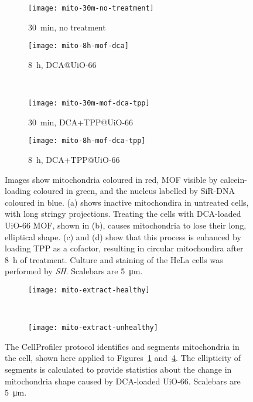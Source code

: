 \begin{figure}[p]
\centering
	\begin{subfigure}[b]{0.49\textwidth}
	\texttt{[image: mito-30m-no-treatment]}
	\caption{\SI{30}{\minute}, no treatment} \label{fig:mito-30m-no-treatment}
	\end{subfigure}
	\hfill
	\begin{subfigure}[b]{0.49\textwidth}
	\texttt{[image: mito-8h-mof-dca]}
	\caption{\SI{8}{\hour}, DCA@UiO-66} \label{fig:mito-8h-mof-dca}
	\end{subfigure}

	~\newline
		\begin{subfigure}[b]{0.49\textwidth}
	\texttt{[image: mito-30m-mof-dca-tpp]}
	\caption{\SI{30}{\minute}, DCA+TPP@UiO-66}\label{fig:mito-30m-mof-dca-tpp}
	\end{subfigure}
	\hfill
	\begin{subfigure}[b]{0.49\textwidth}
	\texttt{[image: mito-8h-mof-dca-tpp]}
	\caption{\SI{8}{\hour}, DCA+TPP@UiO-66}\label{fig:mito-8h-mof-dca-tpp}
	\end{subfigure}
\caption[MOFs: UiO-66 MOF loaded with DCA changes mitochondria's shape]{Images show mitochondria coloured in red, MOF visible by calcein-loading coloured in green, and the nucleus labelled by SiR-DNA coloured in blue. (a) shows inactive mitochondira in untreated cells, with long stringy projections. Treating the cells with DCA-loaded UiO-66 MOF, shown in (b), causes mitochondria to lose their long, elliptical shape. (c) and (d) show that this process is enhanced by loading TPP as a cofactor, resulting in circular mitochondira after \SI{8}{\hour} of treatment. Culture and staining of the HeLa cells was performed by \textit{SH}. Scalebars are \SI{5}{\micro\metre}. }
\label{fig:mito-SIM-images}
\end{figure}
\begin{figure}[p]
\centering
	\begin{subfigure}[b]{0.49\textwidth}

\texttt{[image: mito-extract-healthy]}
	\caption{}
	\end{subfigure} ~
	\begin{subfigure}[b]{0.49\textwidth}
	\texttt{[image: mito-extract-unhealthy]}
	\caption{}
	\end{subfigure}
\caption[MOFs: Mitochondria segmentation in CellProfiler allow statistical shape analysis]{The CellProfiler\cite{carpenter2006cellprofiler} protocol identifies and segments mitochondria in the cell, shown here applied to Figures~\ref{fig:mito-30m-no-treatment} and~\ref{fig:mito-8h-mof-dca-tpp}. The ellipticity of segments is calculated to provide statistics about the change in mitochondria shape caused by DCA-loaded UiO-66. Scalebars are \SI{5}{\micro\metre}. }
\label{fig:cell-profiler-segmentation}
\end{figure}

